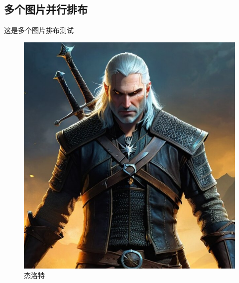 \subsection{多个图片并行排布}
这是多个图片排布测试
\begin{figure}[!htb]
    \setlength{\intextsep}{0pt}   %
    \setlength{\abovecaptionskip}{0.1cm} %
    \setlength{\belowcaptionskip}{0.1cm} %
    \centering
    \begin{minipage}{0.45\textwidth}
        \centering
        \includegraphics[width=\textwidth]{./photo/Witcher_Geralt.jpg}
        \caption{杰洛特}
        \label{fig:geralt1}
    \end{minipage}
    \hfill
    \begin{minipage}{0.45\textwidth}
        \centering

\end{minipage}
\end{figure}

